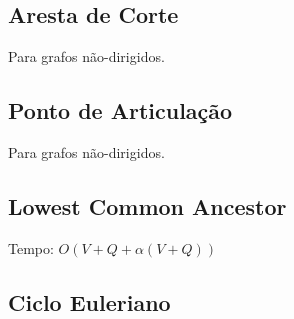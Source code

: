 \documentclass[12pt,a4paper]{article}
\begin{document}
		\subsection{Aresta de Corte}
			Para grafos não-dirigidos.
			
		\subsection{Ponto de Articulação}
			Para grafos não-dirigidos.
			
		\subsection{Lowest Common Ancestor}
			Tempo: \( O(V + Q + \alpha(V + Q)) \)
			
		\subsection{Ciclo Euleriano}
			
\end{document}
